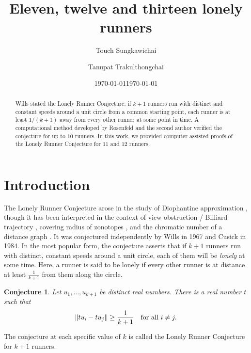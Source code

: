 \documentclass[11pt]{amsart}
\title{Eleven, twelve and thirteen lonely runners}
\author[T. Sungkawichai]{Touch Sungkawichai}
\date{\today}
\author[T. Trakulthongchai]{Tanupat Trakulthongchai}
\date{\today}
\DeclarePairedDelimiter\norm{\lVert}{\rVert}
\newtheorem{conjecture}[theorem]{Conjecture}
\theoremstyle{definition}
\theoremstyle{remark}
\begin{document}
\maketitle
\begin{abstract}
    Wills stated the Lonely Runner Conjecture: if $k+1$ runners run with distinct and constant speeds around a unit circle from a 
    common starting point, each runner is at least $1/(k+1)$ away from every other runner at some point in time.
    A computational method developed by Rosenfeld and the second author verified the conjecture for up to $10$ runners.
    In this work, we provided computer-assisted proofs of the Lonely Runner Conjecture for $11$ and $12$ runners.
\end{abstract}

\section{Introduction}
The Lonely Runner Conjecture arose in the study of Diophantine approximation \cite{Wills},
though it has been interpreted in the context of view obstruction / Billiard trajectory 
\cite{cusick1984view}, covering radius of zonotopes \cite{henze_covering_2017}, and the chromatic number of a 
distance graph \cite{zhu2002circular}. 
It was conjectured independently by Wills \cite{Wills} in 1967 and Cusick\cite{cusick1984view} in 1984. 
In the most popular form, the conjecture asserts that if $k+1$ runners run with distinct,
constant speeds around a unit circle, each of them will be \emph{lonely} at some time. 
Here, a runner is said to be lonely if every other runner is at distance at least $\tfrac{1}{k+1}$ from them along the circle.

\begin{conjecture} \label{lonelyconj}
  Let $u_1,\ldots,u_{k+1}$ be distinct real numbers. There is a real number $t$ such that
  \[
    \norm{t u_i-tu_j} \ge \frac{1}{k+1} \quad \text{for all } i \neq j.
  \]
\end{conjecture}

The conjecture at each specific value of $k$ is called the Lonely Runner Conjecture for $k+1$ runners.
%
\end{document}
